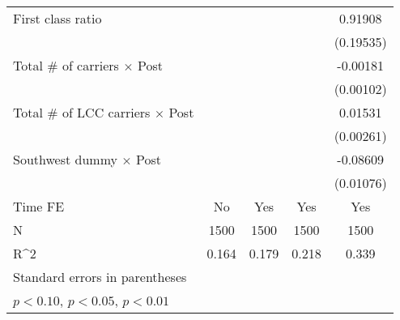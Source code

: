 \begin{table}[htbp]
\begin{tabular}{l*{4}{c}}
\addlinespace
First class ratio   &                     &                     &                     &     0.91908\sym{***}\\
                    &                     &                     &                     &   (0.19535)         \\
\addlinespace
Total # of carriers $\times$ Post&                     &                     &                     &    -0.00181\sym{*}  \\
                    &                     &                     &                     &   (0.00102)         \\
\addlinespace
Total # of LCC carriers $\times$ Post&                     &                     &                     &     0.01531\sym{***}\\
                    &                     &                     &                     &   (0.00261)         \\
\addlinespace
Southwest dummy $\times$ Post&                     &                     &                     &    -0.08609\sym{***}\\
                    &                     &                     &                     &   (0.01076)         \\
\midrule
Time FE             &          No         &         Yes         &         Yes         &         Yes         \\
N                   &        1500         &        1500         &        1500         &        1500         \\
R^2                 &       0.164         &       0.179         &       0.218         &       0.339         \\
\bottomrule
\multicolumn{5}{l}{\footnotesize Standard errors in parentheses}\\
\multicolumn{5}{l}{\footnotesize \sym{*} \(p<0.10\), \sym{**} \(p<0.05\), \sym{***} \(p<0.01\)}\\
\end{tabular}
\end{table}
